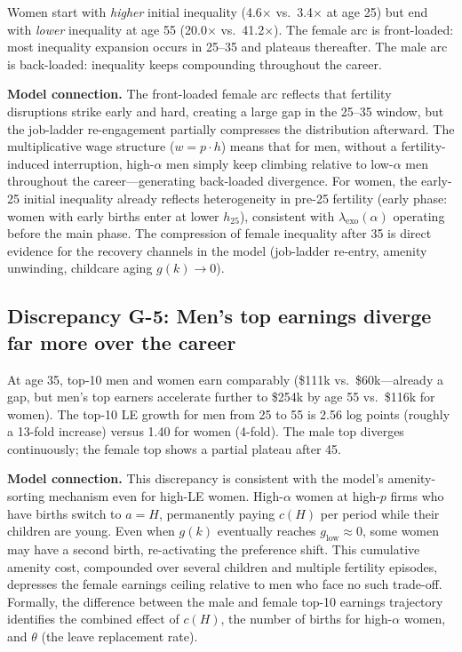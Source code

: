 \documentclass[11pt]{article}
\begin{document}
Women start with \emph{higher} initial inequality (4.6$\times$ vs.\ 3.4$\times$ at age 25) but end with \emph{lower} inequality at age 55 (20.0$\times$ vs.\ 41.2$\times$). The female arc is front-loaded: most inequality expansion occurs in 25--35 and plateaus thereafter. The male arc is back-loaded: inequality keeps compounding throughout the career.

\medskip\noindent\textbf{Model connection.} The front-loaded female arc reflects that fertility disruptions strike early and hard, creating a large gap in the 25--35 window, but the job-ladder re-engagement partially compresses the distribution afterward. The multiplicative wage structure ($w = p \cdot h$) means that for men, without a fertility-induced interruption, high-$\alpha$ men simply keep climbing relative to low-$\alpha$ men throughout the career---generating back-loaded divergence. For women, the early-25 initial inequality already reflects heterogeneity in pre-25 fertility (early phase: women with early births enter at lower $h_{25}$), consistent with $\lambda_{\text{exo}}(\alpha)$ operating before the main phase. The compression of female inequality after 35 is direct evidence for the recovery channels in the model (job-ladder re-entry, amenity unwinding, childcare aging $g(k)\to 0$).

\subsection{Discrepancy G-5: Men's top earnings diverge far more over the career}

At age 35, top-10 men and women earn comparably (\$111k vs.\ \$60k---already a gap, but men's top earners accelerate further to \$254k by age 55 vs.\ \$116k for women). The top-10 LE growth for men from 25 to 55 is 2.56 log points (roughly a 13-fold increase) versus 1.40 for women (4-fold). The male top diverges continuously; the female top shows a partial plateau after 45.

\medskip\noindent\textbf{Model connection.} This discrepancy is consistent with the model's amenity-sorting mechanism even for high-LE women. High-$\alpha$ women at high-$p$ firms who have births switch to $a=H$, permanently paying $c(H)$ per period while their children are young. Even when $g(k)$ eventually reaches $g_{\text{low}} \approx 0$, some women may have a second birth, re-activating the preference shift. This cumulative amenity cost, compounded over several children and multiple fertility episodes, depresses the female earnings ceiling relative to men who face no such trade-off. Formally, the difference between the male and female top-10 earnings trajectory identifies the combined effect of $c(H)$, the number of births for high-$\alpha$ women, and $\theta$ (the leave replacement rate).
\end{document}
